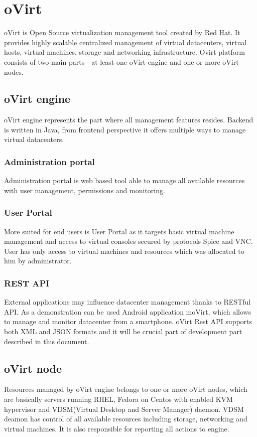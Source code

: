  

\chapter{oVirt}
oVirt is Open Source virtualization management tool created by Red Hat. It provides highly scalable centralized management of virtual datacenters, virtual hosts, virtual machines, storage and networking infrastructure. Ovirt platform consists of two main parts - at least one oVirt engine and one or more oVirt nodes.

\section{oVirt engine}
oVirt engine represents the part where all management features resides. Backend is written in Java, from frontend perspective it offers multiple ways to manage virtual datacenters.

\subsection{Administration portal}
Administration portal is web based tool able to manage all available resources with user management, permissions and monitoring. 

\subsection{User Portal}
More suited for end users is User Portal as it targets basic virtual machine management and access to virtual consoles secured by protocols Spice and VNC. User has only access to virtual machines and resources which was allocated to him by administrator.

\subsection{REST API}
External applications may influence datacenter management thanks to RESTful API. As a demonstration can be used Android application moVirt, which allows to manage and monitor datacenter from a smartphone. oVirt Rest API supports both XML and JSON formats and it will be crucial part of development part described in this document.

\section{oVirt node}
Resources managed by oVirt engine belongs to one or more oVirt nodes, which are basically servers running RHEL, Fedora on Centos with enabled KVM hypervisor and VDSM(Virtual Desktop and Server Manager) daemon. VDSM deamon has control of all available resources including storage, networking and virtual machines. It is also responsible for reporting all actions to engine.


